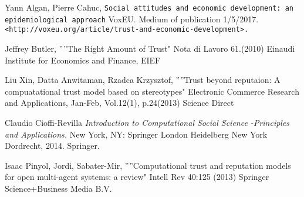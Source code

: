 \documentclass[11pt]{article}
\begin{document}
\begin{thebibliography}{}
Yann Algan, Pierre Cahuc,
\texttt{Social attitudes and economic development: an epidemiological approach}
VoxEU. Medium of publication
1/5/2017.
\texttt{<http://voxeu.org/article/trust-and-economic-development>.}

Jeﬀrey Butler,
''”The Right Amount of Trust"
Nota di Lavoro 61.(2010) 
Einaudi Institute for Economics and Finance, EIEF

Liu Xin, Datta Anwitaman, Rzadca Krzysztof,
''”Trust beyond reputaion: A compuatational
trust model based on stereotypes"
Electronic Commerce Research and Applications, Jan-Feb, Vol.12(1), p.24(2013) 
Science Direct

Claudio Cioﬃ-Revilla
\textit{Introduction to Computational Social Science -Principles and
Applications.}
New York, NY:
Springer London Heidelberg New York Dordrecht,
2014.
Springer.

Isaac Pinyol, Jordi, Sabater-Mir,
''”Computational trust and reputation models for open multi-agent systems: a review"
 Intell Rev 40:125 (2013)  
Springer Science+Business Media B.V.













\end{thebibliography}
\end{document}

